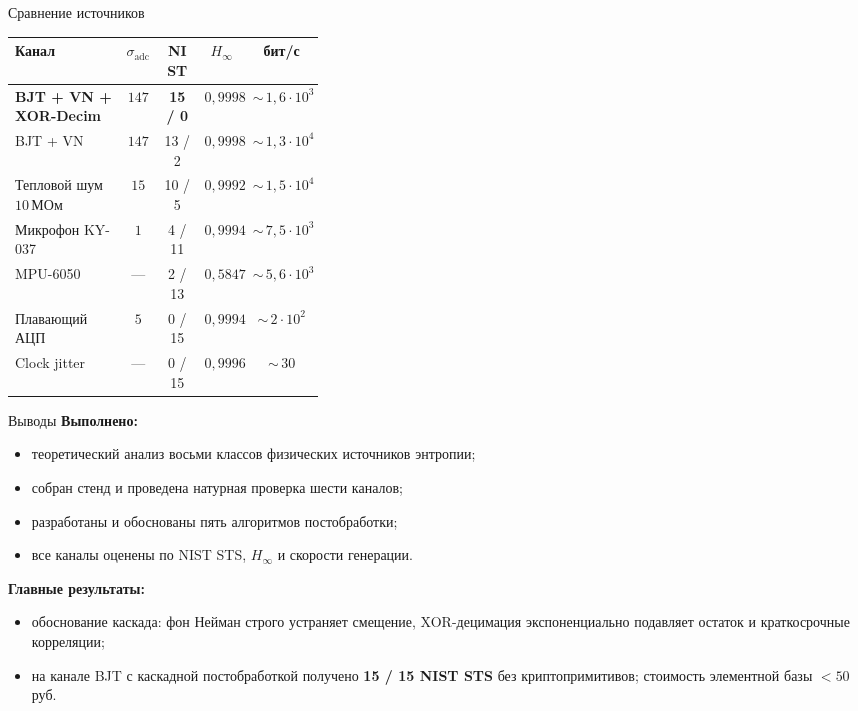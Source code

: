 \documentclass[14pt,aspectratio=169]{beamer}
\begin{document}
\begin{frame}{Сравнение источников}
  \centering
  \footnotesize
  \setlength{\tabcolsep}{6pt}
  \renewcommand{\arraystretch}{1.3}
  \begin{tabular}{|p{0.36\linewidth}|c|c|c|c|}
    \hline
    \textbf{Канал} & $\sigma_\mathrm{adc}$ & \textbf{NIST} & $H_\infty$ & \textbf{бит/с} \\
    \hline
    \textbf{BJT + VN + XOR-Decim} & $147$ & \textbf{15 / 0} & $0{,}99981$ & ${\sim}\,1{,}6{\cdot}10^3$ \\
    \hline
    BJT + VN & $147$ & 13 / 2 & $0{,}99981$ & ${\sim}\,1{,}3{\cdot}10^4$ \\
    \hline
    Тепловой шум $10$\,МОм & $15$ & 10 / 5 & $0{,}99923$ & ${\sim}\,1{,}5{\cdot}10^4$ \\
    \hline
    Микрофон KY-037 & $1$ & 4 / 11 & $0{,}99945$ & ${\sim}\,7{,}5{\cdot}10^3$ \\
    \hline
    MPU-6050 & --- & 2 / 13 & $0{,}58478$ & ${\sim}\,5{,}6{\cdot}10^3$ \\
    \hline
    Плавающий АЦП & $5$ & 0 / 15 & $0{,}99943$ & ${\sim}\,2{\cdot}10^2$ \\
    \hline
    Clock jitter & --- & 0 / 15 & $0{,}99966$ & ${\sim}\,30$ \\
    \hline
  \end{tabular}
\end{frame}

\begin{frame}{Выводы}
  \footnotesize
  \textbf{Выполнено:}
  \begin{itemize}\setlength{\itemsep}{0.2em}
    \item теоретический анализ восьми классов физических источников энтропии;
    \item собран стенд и проведена натурная проверка шести каналов;
    \item разработаны и обоснованы пять алгоритмов постобработки;
    \item все каналы оценены по NIST STS, $H_\infty$ и скорости генерации.
  \end{itemize}
  \vspace{0.4em}
  \textbf{Главные результаты:}
  \begin{itemize}\setlength{\itemsep}{0.2em}
    \item обоснование каскада: фон Нейман строго устраняет смещение, XOR-децимация экспоненциально подавляет остаток и краткосрочные корреляции;
    \item на канале BJT с каскадной постобработкой получено \textbf{15 / 15 NIST STS} без криптопримитивов; стоимость элементной базы $<50$\,руб.
  \end{itemize}
\end{frame}
\end{document}
